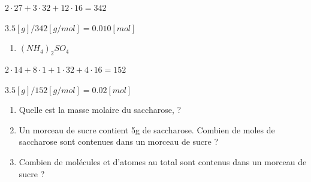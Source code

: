 \documentclass[
  11pt,
  french,
  a4paper,
  openany]{book}
\providecommand{\tightlist}{%
  \setlength{\itemsep}{0pt}\setlength{\parskip}{0pt}}
\begin{document}
\begin{Answer}
\begin{multicols}{2}
\(2 \cdot 27 + 3 \cdot 32 + 12 \cdot 16 = 342\)

\(3.5 [g] / 342 [g/mol] = 0.010 [mol]\)

\begin{enumerate}
\def\labelenumi{\arabic{enumi}.}
\setcounter{enumi}{5}
\tightlist
\item
  \((NH_4)_2SO_4\)
\end{enumerate}

\(2 \cdot 14 + 8 \cdot 1 + 1 \cdot 32 + 4 \cdot 16 = 152\)

\(3.5 [g] / 152 [g/mol] = 0.02 [mol]\)


\end{multicols}


\end{Answer}

\newpage

\begin{Exercise}

\begin{enumerate}
\def\labelenumi{\arabic{enumi}.}
\item
  Quelle est la masse molaire du saccharose,  ?
\item
  Un morceau de sucre contient 5g de saccharose. Combien de moles de saccharose sont contenues dans un morceau de sucre ?
\item
  Combien de molécules et d'atomes au total sont contenus dans un morceau de sucre ?
\end{enumerate}


\end{Exercise}
\end{document}
